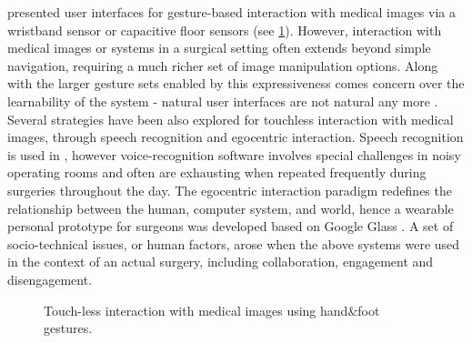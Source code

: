 \citet{Jalaliniya2013} presented user interfaces for gesture-based interaction with medical images via a wristband sensor or capacitive floor sensors (see \figurename{\ref{fig:2-bg:HandFootGesture}}). However, interaction with medical images or systems in a surgical setting often extends beyond simple navigation, requiring a much richer set of image manipulation options. 
Along with the larger gesture sets enabled by this expressiveness comes concern over the learnability of the system - natural user interfaces are not natural any more \cite{Norman2010a,Schwarz2011a}. 
Several strategies have been also explored for touchless interaction with medical images, through speech recognition and egocentric interaction. 
Speech recognition is used in \cite{Ebert2012}, however voice-recognition software involves special challenges in noisy operating rooms and often are exhausting when repeated frequently during surgeries throughout the day. The egocentric interaction paradigm \cite{Pederson2010} redefines the relationship between the human, computer system, and world, hence a wearable personal prototype for surgeons was developed based on Google Glass \cite{Jalaliniya2015}.
A set of socio-technical issues, or human factors, arose when the above systems were used in the context of an actual surgery, including collaboration, engagement and disengagement.
\begin{figure}
	\centering
	\qquad
	\caption{Touch-less interaction with medical images using hand\&foot gestures.}
	\label{fig:2-bg:HandFootGesture}
\end{figure}

